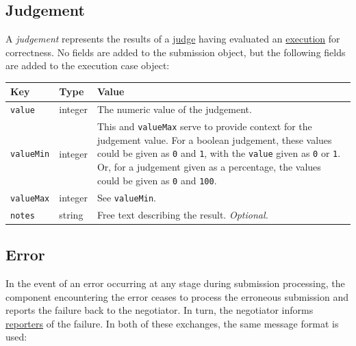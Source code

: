 \documentclass[11pt,letterpaper]{article}
\begin{document}
\subsection{Judgement}
\label{formats-judge}

A \emph{judgement} represents the results of a
\hyperref[design-executor-judge]{judge} having evaluated an
\hyperref[formats-exec]{execution} for correctness. No fields are added to
the submission object, but the following fields are added to the execution case
object:

\nopagebreak
\begin{tabulary}{\textwidth}{ | l | l | L | }
    \hline
    \textbf{Key} & \textbf{Type} & \textbf{Value} \\
    \hline
    \texttt{value} & integer & The numeric value of the judgement. \\
    \hline
    \texttt{valueMin} & integer & This and \texttt{valueMax} serve to provide
        context for the judgement value. For a boolean judgement, these values
        could be given as \texttt{0} and \texttt{1}, with the \texttt{value}
        given as \texttt{0} or \texttt{1}. Or, for a judgement given as a
        percentage, the values could be given as \texttt{0} and \texttt{100}.
        \\
    \hline
    \texttt{valueMax} & integer & See \texttt{valueMin}. \\
    \hline
    \texttt{notes} & string & Free text describing the result.
        \emph{Optional.} \\
    \hline
\end{tabulary}

\subsection{Error}
\label{formats-error}

In the event of an error occurring at any stage during submission processing,
the component encountering the error ceases to process the erroneous submission
and reports the failure back to the negotiator. In turn, the negotiator informs
\hyperref[design-reporter]{reporters} of the failure. In both of these
exchanges, the same message format is used:
\end{document}
